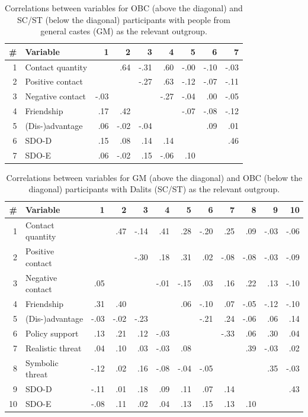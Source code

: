 \documentclass[12pt, a4paper]{article}
\begin{document}
\begin{table}[!hp]
\centering
{}
\caption{Correlations between variables for OBC (above the diagonal) and SC/ST (below the diagonal) participants with people from general castes (GM) as the relevant outgroup.}
\small	
\begin{tabular}{rlrrrrrrr} \toprule
\# & Variable & 1 & 2 & 3 & 4 & 5 & 6 & 7  \\ \midrule 
1 & Contact quantity &  &  .64 & -.31 &  .60 & -.00 & -.10 & -.03 \\ 
  2 & Positive contact &  &  & -.27 &  .63 & -.12 & -.07 & -.11 \\ 
  3 & Negative contact & -.03 &  &  & -.27 & -.04 &  .00 & -.05 \\ 
  4 & Friendship &  .17 &  .42 &  &  & -.07 & -.08 & -.12 \\ 
  5 & (Dis-)advantage &  .06 & -.02 & -.04 &  &  &  .09 &  .01 \\ 
  6 & SDO-D &  .15 &  .08 &  .14 &  .14 &  &  &  .46 \\ 
  7 & SDO-E &  .06 & -.02 &  .15 & -.06 &  .10 &  &  \\  
\bottomrule
\end{tabular}
\label{tab:b-3}
\end{table}

\newpage

\begin{table}[!hp]
\centering
{}
\caption{Correlations between variables for GM (above the diagonal) and OBC (below the diagonal) participants with Dalits (SC/ST) as the relevant outgroup.}
\small	
\begin{tabularx}{\linewidth}{r@{~~}X@{~~}rrrrrrrrrr} \toprule
\# & Variable & 1 & 2 & 3 & 4 & 5 & 6 & 7 & 8 & 9 & 10 \\ \midrule 
1 & Contact quantity &  &  .47 & -.14 &  .41 &  .28 & -.20 &  .25 &  .09 & -.03 & -.06 \\ 
  2 & Positive contact &  &  & -.30 &  .18 &  .31 &  .02 & -.08 & -.08 & -.03 & -.09 \\ 
  3 & Negative contact &  .05 &  &  & -.01 & -.15 &  .03 &  .16 &  .22 &  .13 & -.10 \\ 
  4 & Friendship &  .31 &  .40 &  &  &  .06 & -.10 &  .07 & -.05 & -.12 & -.10 \\ 
  5 & (Dis-)advantage & -.03 & -.02 & -.23 &  &  & -.21 &  .24 & -.06 &  .06 &  .14 \\ 
  6 & Policy support &  .13 &  .21 &  .12 & -.03 &  &  & -.33 &  .06 &  .30 &  .04 \\ 
  7 & Realistic threat &  .04 &  .10 &  .03 & -.03 &  .08 &  &  &  .39 & -.03 &  .02 \\ 
  8 & Symbolic threat & -.12 &  .02 &  .16 & -.08 & -.04 & -.05 &  &  &  .35 & -.03 \\ 
  9 & SDO-D & -.11 &  .01 &  .18 &  .09 &  .11 &  .07 &  .14 &  &  &  .43 \\ 
  10 & SDO-E & -.08 &  .11 &  .02 &  .04 &  .13 &  .15 &  .13 &  .10 &  &  \\ 
\bottomrule
\end{tabularx}
\label{tab:b-4}
\end{table}
\end{document}
